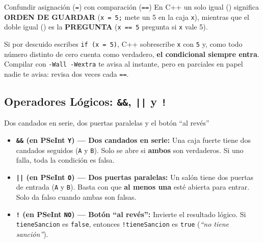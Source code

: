\documentclass[11pt,letterpaper]{article}
\begin{document}
\begin{peligro}{Confundir asignación (\texttt{=}) con comparación (\texttt{==})}
En C++ un solo igual (\codigo{=}) significa \textbf{ORDEN DE GUARDAR} (\texttt{x = 5;} mete un 5 en la caja \texttt{x}), mientras que el doble igual (\codigo{==}) es la \textbf{PREGUNTA} (\texttt{x == 5} pregunta si \texttt{x} vale 5).

Si por descuido escribes \texttt{if (x = 5)}, C++ sobrescribe \texttt{x} con \texttt{5} y, como todo número distinto de cero cuenta como verdadero, \textbf{el condicional siempre entra}. Compilar con \texttt{-Wall -Wextra} te avisa al instante, pero en parciales en papel nadie te avisa: revisa dos veces cada \texttt{==}.
\end{peligro}

\subsection{Operadores Lógicos: \texttt{\&\&}, \texttt{||} y \texttt{!}}

\begin{paratontos}{Dos candados en serie, dos puertas paralelas y el botón ``al revés''}
\begin{itemize}
  \item \textbf{\texttt{\&\&} (en PSeInt \texttt{Y}) --- Dos candados en serie:} Una caja fuerte tiene dos candados seguidos (\texttt{A} y \texttt{B}). Solo se abre si \textbf{ambos} son verdaderos. Si uno falla, toda la condición es falsa.
  \item \textbf{\texttt{||} (en PSeInt \texttt{O}) --- Dos puertas paralelas:} Un salón tiene dos puertas de entrada (\texttt{A} y \texttt{B}). Basta con que \textbf{al menos una} esté abierta para entrar. Solo da falso cuando ambas son falsas.
  \item \textbf{\texttt{!} (en PSeInt \texttt{NO}) --- Botón ``al revés'':} Invierte el resultado lógico. Si \texttt{tieneSancion} es \texttt{false}, entonces \texttt{!tieneSancion} es \texttt{true} (\textit{``no tiene sanción''}).
\end{itemize}
\end{paratontos}
\end{document}
